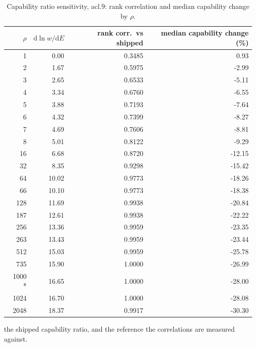 \begin{table}[htbp]
  \centering
  \caption{Capability ratio sensitivity, acl.9: rank correlation and median capability change by $\rho$.}
  \label{tab:rho-acl-9-summary}
  \begin{tabular}{r r r r}
    \toprule
    $\rho$ & $\mathrm{d}\ln w/\mathrm{d}E$ & rank corr.\ vs shipped & median capability change (\%) \\
    \midrule
    1 & 0.00 & 0.3485 & 0.93 \\
    2 & 1.67 & 0.5975 & -2.99 \\
    3 & 2.65 & 0.6533 & -5.11 \\
    4 & 3.34 & 0.6760 & -6.55 \\
    5 & 3.88 & 0.7193 & -7.64 \\
    6 & 4.32 & 0.7399 & -8.27 \\
    7 & 4.69 & 0.7606 & -8.81 \\
    8 & 5.01 & 0.8122 & -9.29 \\
    16 & 6.68 & 0.8720 & -12.15 \\
    32 & 8.35 & 0.9298 & -15.42 \\
    64 & 10.02 & 0.9773 & -18.26 \\
    66 & 10.10 & 0.9773 & -18.38 \\
    128 & 11.69 & 0.9938 & -20.84 \\
    187 & 12.61 & 0.9938 & -22.22 \\
    256 & 13.36 & 0.9959 & -23.35 \\
    263 & 13.43 & 0.9959 & -23.44 \\
    512 & 15.03 & 0.9959 & -25.78 \\
    735 & 15.90 & 1.0000 & -26.99 \\
    1000 * & 16.65 & 1.0000 & -28.00 \\
    1024 & 16.70 & 1.0000 & -28.08 \\
    2048 & 18.37 & 0.9917 & -30.30 \\
    \bottomrule
  \end{tabular}
  \par\smallskip\footnotesize * the shipped capability ratio, and the reference the correlations are measured against.
\end{table}
